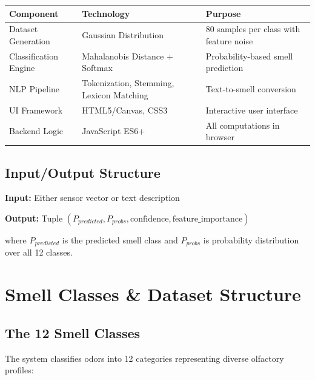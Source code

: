 \documentclass[10pt]{article}
\begin{document}
\begin{table}[ht]
\centering
\begin{tabular}{|l|l|p{6cm}|}
\hline
\textbf{Component} & \textbf{Technology} & \textbf{Purpose} \\
\hline
Dataset Generation & Gaussian Distribution & 80 samples per class with feature noise \\
Classification Engine & Mahalanobis Distance + Softmax & Probability-based smell prediction \\
NLP Pipeline & Tokenization, Stemming, Lexicon Matching & Text-to-smell conversion \\
UI Framework & HTML5/Canvas, CSS3 & Interactive user interface \\
Backend Logic & JavaScript ES6+ & All computations in browser \\
\hline
\end{tabular}
\end{table}

\subsection{Input/Output Structure}

\textbf{Input:} Either sensor vector or text description

\textbf{Output:} Tuple $(P_{predicted}, P_{probs}, \text{confidence}, \text{feature\_importance})$

where $P_{predicted}$ is the predicted smell class and $P_{probs}$ is probability distribution over all 12 classes.


\section{Smell Classes \& Dataset Structure}

\subsection{The 12 Smell Classes}

The system classifies odors into 12 categories representing diverse olfactory profiles:
\end{document}
